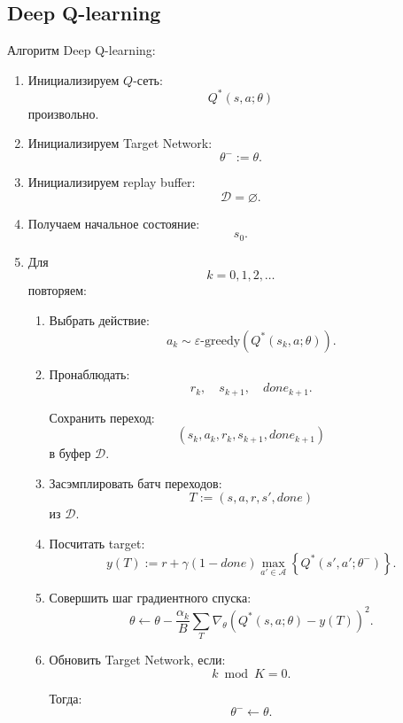 \documentclass[12pt,a4paper]{article}
\begin{document}
\subsection{Deep Q-learning}

Алгоритм Deep Q-learning:

\begin{enumerate}
    \item Инициализируем $Q$-сеть:
    \[
    Q^\ast(s,a;\theta)
    \]
    произвольно.

    \item Инициализируем Target Network:
    \[
    \theta^- := \theta.
    \]

    \item Инициализируем replay buffer:
    \[
    \mathcal D = \varnothing.
    \]

    \item Получаем начальное состояние:
    \[
    s_0.
    \]

    \item Для
    \[
    k=0,1,2,\ldots
    \]
    повторяем:
    \begin{enumerate}
        \item Выбрать действие:
        \[
        a_k
        \sim
        \varepsilon\text{-greedy}
        \left(
        Q^\ast(s_k,a;\theta)
        \right).
        \]

        \item Пронаблюдать:
        \[
        r_k,\quad s_{k+1},\quad done_{k+1}.
        \]

        Сохранить переход:
        \[
        (s_k,a_k,r_k,s_{k+1},done_{k+1})
        \]
        в буфер $\mathcal D$.

        \item Засэмплировать батч переходов:
        \[
        T := (s,a,r,s',done)
        \]
        из $\mathcal D$.

        \item Посчитать target:
        \[
        y(T)
        :=
        r
        +
        \gamma(1-done)
        \max_{a' \in \mathcal A}
        \left\{
        Q^\ast(s',a';\theta^-)
        \right\}.
        \]

        \item Совершить шаг градиентного спуска:
        \[
        \theta
        \leftarrow
        \theta
        -
        \frac{\alpha_k}{B}
        \sum_T
        \nabla_\theta
        \left(
        Q^\ast(s,a;\theta)-y(T)
        \right)^2.
        \]

        \item Обновить Target Network, если:
        \[
        k \bmod K = 0.
        \]

        Тогда:
        \[
        \theta^- \leftarrow \theta.
        \]
    \end{enumerate}
\end{enumerate}
\end{document}
